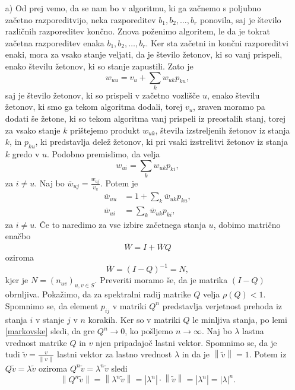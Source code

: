\documentclass[twoside,11pt]{article}
\begin{document}
\begin{enumerate}
    \item[a)] Od prej vemo, da se nam bo v algoritmu, ki ga začnemo s poljubno začetno razporeditvijo, neka razporeditev $b_{1},b_{2},\ldots,b_{r}$ ponovila, saj je število različnih razporeditev končno. Znova poženimo algoritem, le da je tokrat začetna razporeditev enaka $b_{1},b_{2},\ldots,b_{r}$. Ker sta začetni in končni razporeditvi enaki, mora za vsako stanje veljati, da je število žetonov, ki so vanj prispeli, enako številu žetonov, ki so stanje zapustili. Zato je 
$$w_{uu} = v_{u} + \sum_{k} w_{uk}p_{ku},$$ saj je število žetonov, ki so prispeli v začetno vozlišče $u$, enako številu žetonov, ki smo ga tekom algoritma dodali, torej $v_{u}$, zraven moramo pa dodati še žetone, ki so tekom algoritma vanj prispeli iz preostalih stanj, torej za vsako stanje $k$ prištejemo produkt $w_{uk}$, števila izstreljenih žetonov iz stanja $k$, in $p_{ku}$, ki predstavlja delež žetonov, ki pri vsaki izstrelitvi žetonov iz stanja $k$ gredo v $u$. 
Podobno premislimo, da velja
$$w_{ui} = \sum_{k} w_{uk}p_{ki},$$ za $i\neq u$.
Naj bo $\overline{w}_{uj} = \frac{w_{uj}}{v_{u}}$. Potem je 
\[
    \begin{split}
        \overline{w}_{uu} &= 1 + \sum_{k} \overline{w}_{uk}p_{ku}, \\
        \overline{w}_{ui} &= \sum_{k} \overline{w}_{uk}p_{ki}, 
    \end{split}
\]
za $i\neq u$.
\noindent Če to naredimo za vse izbire začetnega stanja $u$, dobimo matrično enačbo
$$\overline{W} = I + \overline{W}Q$$
oziroma
$$\overline{W} = (I - Q)^{-1} = N,$$
kjer je $N=(n_{uv})_{u,v \in S}$. Preveriti moramo še, da je matrika $(I-Q)$ obrnljiva. Pokažimo, da za spektralni radij matrike $Q$ velja $\rho(Q) < 1$. Spomnimo se, da element $p_{ij}$ v matriki $Q^n$ predstavlja verjetnost prehoda iz stanja $i$ v stanje $j$ v $n$ korakih. Ker so v matriki $Q$ le minljiva stanja, po lemi \ref{markovske} sledi, da gre $Q^n \rightarrow 0$, ko pošljemo $n\rightarrow \infty$. Naj bo $\lambda$ lastna vrednost matrike $Q$ in $v$ njen pripadajoč lastni vektor. 
Spomnimo se, da je tudi $\widetilde{v} = \frac{v}{\left\lVert v\right\rVert }$ lastni vektor za lastno vrednost $\lambda$ in da je $\left\lVert \widetilde{v}\right\rVert = 1$. Potem iz $Q\widetilde{v} = \lambda\widetilde{v}$ oziroma $Q^n\widetilde{v} = \lambda^n\widetilde{v}$ sledi
\[
    \left\lVert Q^n\widetilde{v} \right\rVert = \left\lVert \lambda^n\widetilde{v}\right\rVert = \left\lvert \lambda^n\right\rvert\cdot \left\lVert \widetilde{v}\right\rVert = \left\lvert \lambda^n\right\rvert = \left\lvert \lambda\right\rvert^n.
\]
\end{enumerate}
\end{document}
